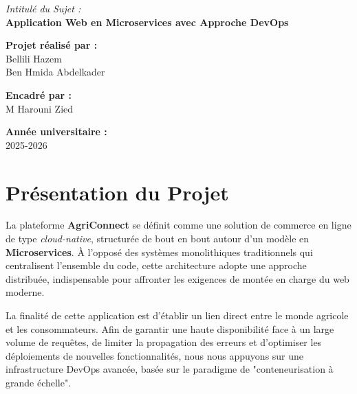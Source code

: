 \documentclass[12pt,a4paper]{article}
\begin{document}
\begin{titlepage}
\begin{center}
        {\large \textit{Intitulé du Sujet :}} \\[0.4cm]
        {\Large \textbf{Application Web en Microservices avec Approche DevOps}}
        
        \vfill
        \vspace{1.5cm}
        
        {\large \textbf{Projet réalisé par :}} \\[0.3cm]
        {\large Bellili Hazem } \\
        {\large {Ben Hmida Abdelkader}}
        
        \vfill
        \vspace{0.8cm}
        
        {\large \textbf{Encadré par :}} \\[0.3cm]
        {\large M Harouni Zied}
        
        \vfill
        \vspace{1.5cm}
        
        {\large \textbf{Année universitaire :}} \\
        {\large 2025-2026}
        
    \end{center}
\end{titlepage}

\tableofcontents
\newpage

\section{Présentation du Projet}

La plateforme \textbf{AgriConnect} se définit comme une solution de commerce en ligne de type \textit{cloud-native}, structurée de bout en bout autour d'un modèle en \textbf{Microservices}. À l'opposé des systèmes monolithiques traditionnels qui centralisent l'ensemble du code, cette architecture adopte une approche distribuée, indispensable pour affronter les exigences de montée en charge du web moderne.

La finalité de cette application est d'établir un lien direct entre le monde agricole et les consommateurs. Afin de garantir une haute disponibilité face à un large volume de requêtes, de limiter la propagation des erreurs et d'optimiser les déploiements de nouvelles fonctionnalités, nous nous appuyons sur une infrastructure DevOps avancée, basée sur le paradigme de "conteneurisation à grande échelle".
\end{document}

